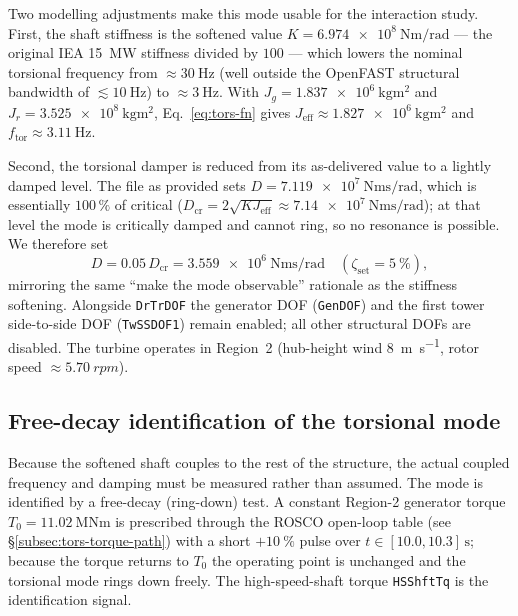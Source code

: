 Two modelling adjustments make this mode usable for the interaction study.
First, the shaft stiffness is the softened value
\(K = \SI{6.974e8}{\newton\metre\per\radian}\) --- the original IEA
\SI{15}{\mega\watt} stiffness divided by \(100\) --- which lowers the nominal
torsional frequency from \(\approx\SI{30}{\hertz}\) (well outside the OpenFAST
structural bandwidth of \(\lesssim\SI{10}{\hertz}\)) to \(\approx\SI{3}{\hertz}\).
With \(J_g = \SI{1.837e6}{\kilo\gram\metre\squared}\) and
\(J_r = \SI{3.525e8}{\kilo\gram\metre\squared}\),
Eq.~\eqref{eq:tors-fn} gives \(J_{\mathrm{eff}}\approx\SI{1.827e6}{\kilo\gram\metre\squared}\)
and \(f_{\mathrm{tor}}\approx\SI{3.11}{\hertz}\).

Second, the torsional damper is reduced from its as-delivered value to a lightly
damped level. The file as provided sets
\(D = \SI{7.119e7}{\newton\metre\second\per\radian}\), which is essentially
\(100\,\%\) of critical (\(D_{\mathrm{cr}} = 2\sqrt{K J_{\mathrm{eff}}}
\approx \SI{7.14e7}{\newton\metre\second\per\radian}\)); at that level the mode
is critically damped and cannot ring, so no resonance is possible. We therefore
set
\begin{equation}
  D = 0.05\,D_{\mathrm{cr}} = \SI{3.559e6}{\newton\metre\second\per\radian}
  \quad(\zeta_{\mathrm{set}} = \SI{5}{\percent}),
  \label{eq:tors-damp}
\end{equation}
mirroring the same ``make the mode observable'' rationale as the stiffness
softening. Alongside \texttt{DrTrDOF} the generator DOF (\texttt{GenDOF}) and the
first tower side-to-side DOF (\texttt{TwSSDOF1}) remain enabled; all other
structural DOFs are disabled. The turbine operates in Region~2 (hub-height wind
\SI{8}{\metre\per\second}, rotor speed \(\approx\SI{5.70}{rpm}\)).

\subsection{Free-decay identification of the torsional mode}
\label{subsec:tors-decay}

Because the softened shaft couples to the rest of the structure, the actual
coupled frequency and damping must be measured rather than assumed. The mode is
identified by a free-decay (ring-down) test. A constant Region-2 generator
torque \(T_0=\SI{11.02}{\mega\newton\metre}\) is prescribed through the ROSCO
open-loop table (see \S\ref{subsec:tors-torque-path}) with a short
\(+\SI{10}{\percent}\) pulse over \(t\in[10.0,10.3]\,\si{\second}\); because the
torque returns to \(T_0\) the operating point is unchanged and the torsional
mode rings down freely. The high-speed-shaft torque \texttt{HSShftTq} is the
identification signal.

